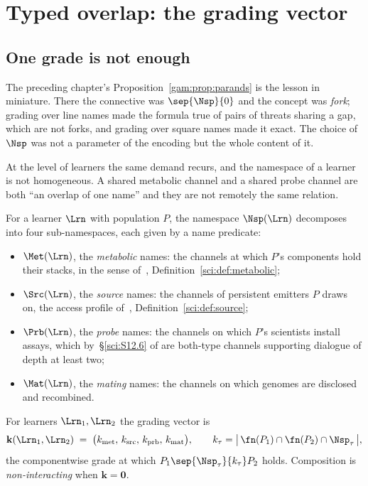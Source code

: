\section{Typed overlap: the grading vector}\label{com:sec:typed}\label{com:S5}

\subsection{One grade is not enough}\label{com:S5.1}

The preceding chapter's Proposition~\ref{gam:prop:parands} is the lesson in miniature. There the connective was
$\sep{\Nsp}{0}$ and the concept was \emph{fork}; grading over line names made the formula true of
pairs of threats sharing a gap, which are not forks, and grading over square names made it exact.
The choice of $\Nsp$ was not a parameter of the encoding but the whole content of it.

At the level of learners the same demand recurs, and the namespace of a learner is not
homogeneous. A shared metabolic channel and a shared probe channel are both ``an overlap of one
name'' and they are not remotely the same relation.

\begin{definition}\label{com:def:typed}
For a learner $\Lrn$ with population $P$, the namespace $\Nsp(\Lrn)$ decomposes into four
sub-namespaces, each given by a name predicate:
\begin{itemize}[itemsep=2pt]
\item $\Met(\Lrn)$, the \emph{metabolic} names: the channels at which $P$'s components hold their
stacks, in the sense of~\chSci, Definition~\ref{sci:def:metabolic};
\item $\Src(\Lrn)$, the \emph{source} names: the channels of persistent emitters $P$ draws on,
the access profile of~\chSci, Definition~\ref{sci:def:source};
\item $\Prb(\Lrn)$, the \emph{probe} names: the channels on which $P$'s scientists install
assays, which by~\S\ref{sci:S12.6} of \chSci are both-type channels supporting dialogue of depth at
least two;
\item $\Mat(\Lrn)$, the \emph{mating} names: the channels on which genomes are disclosed and
recombined.
\end{itemize}
\end{definition}

\begin{definition}\label{com:def:vector}
For learners $\Lrn_1,\Lrn_2$ the grading vector is
\[
  \mathbf{k}(\Lrn_1,\Lrn_2) \;=\;
  \bigl(k_{\mathrm{met}},\, k_{\mathrm{src}},\, k_{\mathrm{prb}},\, k_{\mathrm{mat}}\bigr),
  \qquad
  k_{\tau} = \bigl|\, \fn(P_1)\cap \fn(P_2) \cap \Nsp_{\tau} \,\bigr| ,
\]
the componentwise grade at which $P_1 \sep{\Nsp_\tau}{k_\tau} P_2$ holds. Composition is
\emph{non-interacting} when $\mathbf{k} = \mathbf{0}$.
\end{definition}

